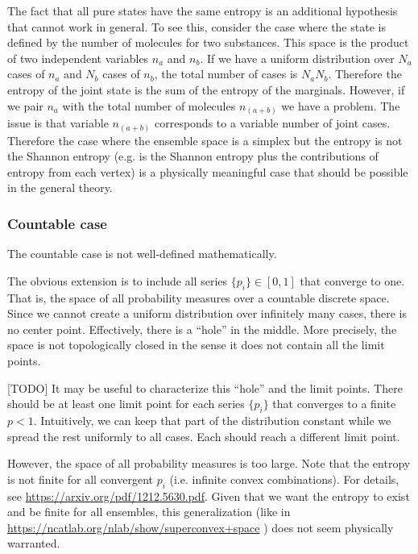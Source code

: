 The fact that all pure states have the same entropy is an additional hypothesis that cannot work in general. To see this, consider the case where the state is defined by the number of molecules for two substances. This space is the product of two independent variables $n_a$ and $n_b$. If we have a uniform distribution over $N_a$ cases of $n_a$ and $N_b$ cases of $n_b$, the total number of cases is $N_a N_b$. Therefore the entropy of the joint state is the sum of the entropy of the marginals. However, if we pair $n_a$ with the total number of molecules $n_{(a+b)}$ we have a problem. The issue is that variable $n_{(a+b)}$ corresponds to a variable number of joint cases. Therefore the case where the ensemble space is a simplex but the entropy is not the Shannon entropy (e.g. is the Shannon entropy plus the contributions of entropy from each vertex) is a physically meaningful case that should be possible in the general theory.

\subsubsection{Countable case}

The countable case is not well-defined mathematically.

The obvious extension is to include all series $\{p_i\} \in [0,1]$ that converge to one. That is, the space of all probability measures over a countable discrete space. Since we cannot create a uniform distribution over infinitely many cases, there is no center point. Effectively, there is a ``hole'' in the middle. More precisely, the space is not topologically closed in the sense it does not contain all the limit points.

[TODO] It may be useful to characterize this ``hole'' and the limit points. There should be at least one limit point for each series $\{p_i\}$ that converges to a finite $p < 1$. Intuitively, we can keep that part of the distribution constant while we spread the rest uniformly to all cases. Each should reach a different limit point.

However, the space of all probability measures is too large. Note that the entropy is not finite for all convergent $p_i$ (i.e. infinite convex combinations). For details, see \url{https://arxiv.org/pdf/1212.5630.pdf}. Given that we want the entropy to exist and be finite for all ensembles, this generalization (like in \url{https://ncatlab.org/nlab/show/superconvex+space} ) does not seem physically warranted.


